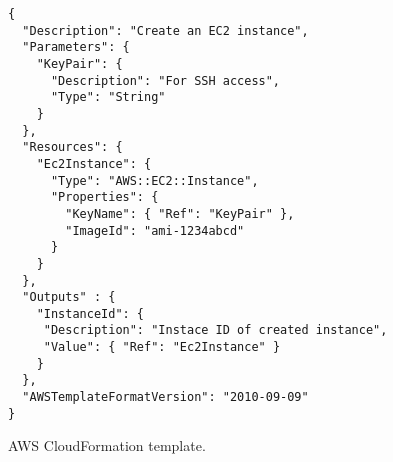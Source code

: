 \begin{figure}
  \begin{center}
    \begin{verbatim}
{
  "Description": "Create an EC2 instance",
  "Parameters": {
    "KeyPair": {
      "Description": "For SSH access",
      "Type": "String"
    }
  },
  "Resources": {
    "Ec2Instance": {
      "Type": "AWS::EC2::Instance",
      "Properties": {
        "KeyName": { "Ref": "KeyPair" },
        "ImageId": "ami-1234abcd" 
      }
    }
  },
  "Outputs" : {
    "InstanceId": {
     "Description": "Instace ID of created instance",
     "Value": { "Ref": "Ec2Instance" }
    }
  },
  "AWSTemplateFormatVersion": "2010-09-09"
}
    \end{verbatim}
  \end{center}
  \caption{AWS CloudFormation template.}
  \label{fig:cloudformation-template}
\end{figure}

